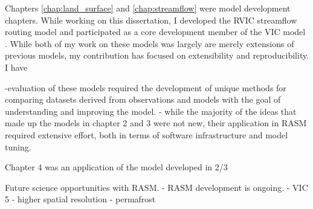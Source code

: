 Chapters \ref{chap:land_surface} and \ref{chap:streamflow} were model development chapters.
While working on this dissertation, I developed the RVIC streamflow routing model \citep{Hamman_2015,Hamman_2016b} and participated as a core development member of the VIC model \citep{Hamman_2016c,Hamman_2016d}.
While both of my work on these models was largely are merely extensions of previous models, my contribution has focused on extensibility and reproducibility.
I have

  -evaluation of these models required the development of unique methods for comparing datasets derived from observations and models with the goal of understanding and improving the model.
  - while the majority of the ideas that made up the models in chapter 2 and 3 were not new, their application in RASM required extensive effort, both in terms of software infrastructure and model tuning.

Chapter 4 was an application of the model developed in 2/3

Future science opportunities with RASM.
  - RASM development is ongoing.
  - VIC 5
  - higher spatial resolution
  - permafrost
